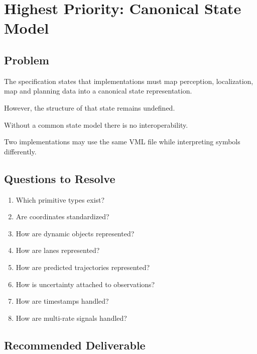 \documentclass[a4paper,11pt]{article}
\begin{document}
\section{Highest Priority: Canonical State Model}

\subsection{Problem}

The specification states that implementations must map
perception, localization, map and planning data into a
canonical state representation.

However, the structure of that state remains undefined.

Without a common state model there is no interoperability.

Two implementations may use the same VML file
while interpreting symbols differently.

\subsection{Questions to Resolve}

\begin{enumerate}

\item Which primitive types exist?

\item Are coordinates standardized?

\item How are dynamic objects represented?

\item How are lanes represented?

\item How are predicted trajectories represented?

\item How is uncertainty attached to observations?

\item How are timestamps handled?

\item How are multi-rate signals handled?

\end{enumerate}

\subsection{Recommended Deliverable}
\end{document}
